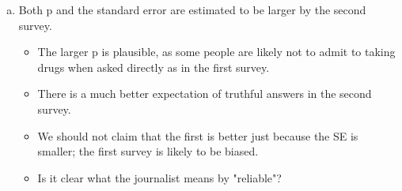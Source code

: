 \documentclass[a4paper,12pt]{article}
\begin{document}
\begin{enumerate}[(a)]
\begin{framed}
\end{framed}
\item Both p and the standard error are estimated to be larger by the second survey.
\begin{itemize}
    \item The larger p is plausible, as some people are likely not to admit to taking drugs when
asked directly as in the first survey.
    \item There is a much better expectation of truthful
answers in the second survey.
    \item We should not claim that the first is better just because
the SE is smaller; the first survey is likely to be biased. 
    \item Is it clear what the journalist
means by "reliable"?
\end{itemize}

\end{enumerate}
\end{document}
